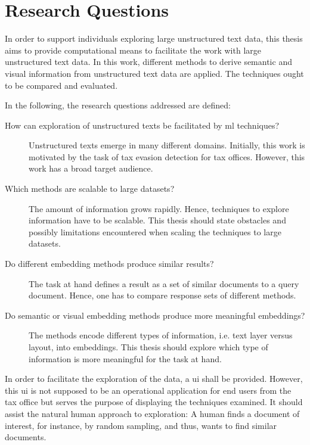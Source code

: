 \section{Research Questions}\label{sec:research-questions}

In order to support individuals exploring large unstructured text data, 
this thesis aims to provide computational means to facilitate the work with large unstructured text data.
In this work, different methods to derive semantic and visual information from unstructured text data are applied.
The techniques ought to be compared and evaluated.

In the following, the research questions addressed are defined:
\begin{description}
    \item[How can exploration of unstructured texts be facilitated by \ac{ml} techniques?]
    Unstructured texts emerge in many different domains.
    Initially, this work is motivated by the task of tax evasion detection for tax offices.
    However, this work has a broad target audience.

    \item[Which methods are scalable to large datasets?]
    The amount of information grows rapidly.
    Hence, techniques to explore information have to be scalable.
    This thesis should state obstacles and possibly limitations encountered when scaling the techniques to large datasets.

    \item[Do different embedding methods produce similar results?]
    The task at hand defines a result as a set of similar documents to a query document.
    Hence, one has to compare response sets of different methods.

    \item[Do semantic or visual embedding methods produce more meaningful embeddings?]
    The methods encode different types of information, i.e. text layer versus layout, into embeddings. 
    This thesis should explore which type of information is more meaningful for the task at hand.


\end{description}


In order to facilitate the exploration of the data, a \ac{ui} shall be provided.
However, this \ac{ui} is not supposed to be an operational application for end users from the tax office 
but serves the purpose of displaying the techniques examined.
It should assist the natural human approach to exploration:
A human finds a document of interest, for instance, by random sampling, and thus, wants to find similar documents.

